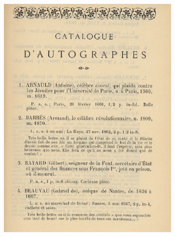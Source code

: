 \begin{figure}[h]
	\centering
	\begin{subfigure}{0.49\textwidth}
		\includegraphics[width=\textwidth]{img/CAT_000441_0.png}
	\end{subfigure}
	\begin{subfigure}{0.49\textwidth}

\end{subfigure}
\end{figure}
